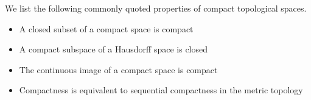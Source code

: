 \documentclass[12pt]{article}
\begin{document}
We list the following commonly quoted properties of compact topological spaces.


\begin{itemize}
\item A closed subset of a compact space is compact
\item A compact subspace of a Hausdorff space is closed
\item The continuous image of a compact space is compact
\item Compactness is equivalent to sequential compactness in the metric topology
\end{itemize}
\end{document}
